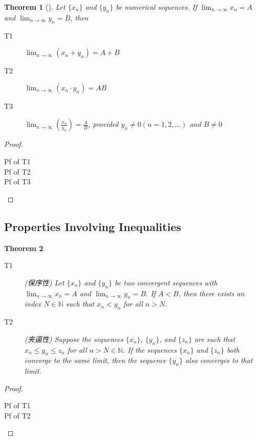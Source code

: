 \documentclass[onecolumn]{ctexart}
\newtheorem{theorem}{Theorem}
\begin{document}
\begin{theorem}[]
  Let $\lbrace x_n \rbrace$ and $\lbrace y_n \rbrace$ be numerical sequences. If 
  $\lim_{n \to \infty} x_n = A$ and $\lim_{n \to \infty} y_n = B$, then
  \begin{description}
    \item[T1] $\lim_{n \to \infty} (x_n + y_n) = A + B$
    \item[T2] $\lim_{n \to \infty} (x_n \cdot y_n) = AB$
    \item[T3] $\lim_{n \to \infty} (\frac{x_n}{y_n}) = \frac{A}{B}$, provided 
    $y_n \neq 0 (n=1,2,\ldots)$ and $B \neq 0$
  \end{description}
\end{theorem}
\begin{proof}
  \begin{description}
    \item[Pf of T1] 
    \item[Pf of T2] 
    \item[Pf of T3] 
  \end{description}
\end{proof}

\subsection{Properties Involving Inequalities}

\begin{theorem}
  \begin{description}
    \item[T1] (保序性) Let $\lbrace x_n \rbrace$ and $\lbrace y_n \rbrace$ be two 
    convergent sequences with $\lim_{n \to \infty} x_n = A$ and $\lim_{n \to 
    \infty} y_n = B$. If $A < B$, then there exists an index $N \in \mathbb{N}$ 
    such that $x_n < y_n$ for all $n > N$.
    \item[T2] (夹逼性) Suppose the sequences $\lbrace x_n \rbrace$, $\lbrace y_n \rbrace$, 
    and $\lbrace z_n \rbrace$ are such that $x_n \leq y_n \leq z_n$ for all $n > 
    N \in \mathbb{N}$. If the sequences $\lbrace x_n \rbrace$ and $\lbrace z_n 
    \rbrace$ both converge to the same limit, then the sequence $\lbrace y_n 
    \rbrace$ also converges to that limit.
  \end{description}
\end{theorem}
\begin{proof}
  \begin{description}
    \item[Pf of T1] 
    \item[Pf of T2] 
  \end{description}
\end{proof}
\end{document}

